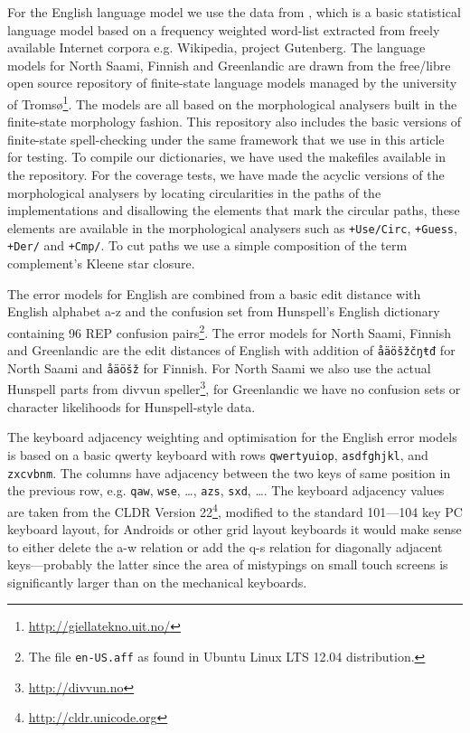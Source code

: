 \documentclass[a4paper,12pt]{article}
\begin{document}
For the English language model we use the data from
\cite{norvig/2010,pirinen2012effects}, which is a basic statistical language
model based on a frequency weighted word-list extracted from freely available
Internet corpora e.g. Wikipedia, project Gutenberg.  The language models for
North Saami, Finnish and Greenlandic are drawn from the free/libre open source
repository of finite-state language models managed by the university of
Tromsø\footnote{\url{http://giellatekno.uit.no/}}. The models are all based on
the morphological analysers built in the finite-state morphology
\cite[]{beesley2003finite} fashion. This repository also includes the basic
versions of finite-state spell-checking under the same framework that we use in
this article for testing. To compile our dictionaries, we have used the
makefiles available in the repository.  For the coverage tests, we have made
the acyclic versions of the morphological analysers by locating circularities
in the paths of the implementations and disallowing the elements that mark the
circular paths, these elements are available in the morphological analysers
such as \texttt{+Use/Circ}, \texttt{+Guess}, \texttt{+Der/} and \texttt{+Cmp/}.
To cut paths we use a simple composition of the term complement's Kleene star
closure.

The error models for English are combined from a basic edit distance with
English alphabet a-z and the confusion set from Hunspell's English dictionary
containing 96 REP confusion pairs\footnote{The file \texttt{en-US.aff} as found
in Ubuntu Linux LTS 12.04 distribution.}. The error models for North Saami,
Finnish and Greenlandic are the edit distances of English with addition of
\texttt{åäöšžčŋŧđ} for North Saami and \texttt{åäöšž} for Finnish. For North
Saami we also use the actual Hunspell parts from divvun
speller\footnote{\url{http://divvun.no}}, for Greenlandic we have no confusion
sets or character likelihoods for Hunspell-style data.

The keyboard adjacency weighting and optimisation for the English error models
is based on a basic qwerty keyboard with rows \texttt{qwertyuiop},
\texttt{asdfghjkl}, and \texttt{zxcvbnm}. The columns have adjacency between
the two keys of same position in the previous row, e.g. \texttt{qaw},
\texttt{wse}, \ldots, \texttt{azs}, \texttt{sxd}, \ldots.  The keyboard
adjacency values are taken from the CLDR Version
22\footnote{\url{http://cldr.unicode.org}}, modified to the standard 101---104
key PC keyboard layout, for Androids or other grid layout keyboards it would
make sense to either delete the a-w relation or add the q-s relation for
diagonally adjacent keys---probably the latter since the area of mistypings on
small touch screens is significantly larger than on the mechanical keyboards.
\end{document}
